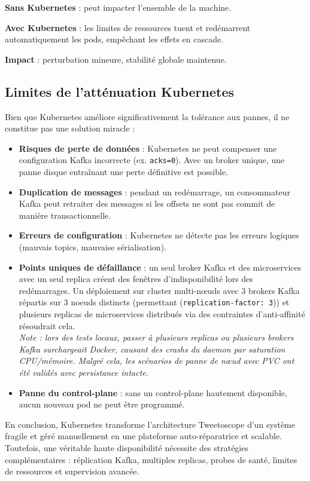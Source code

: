 \documentclass[10pt,a4paper]{article}
\begin{document}
\textbf{Sans Kubernetes} : peut impacter l’ensemble de la machine.

\textbf{Avec Kubernetes} : les limites de ressources tuent et redémarrent automatiquement les pods, empêchant les effets en cascade.

\textbf{Impact} : perturbation mineure, stabilité globale maintenue.

\subsection{Limites de l’atténuation Kubernetes}

Bien que Kubernetes améliore significativement la tolérance aux pannes, il ne constitue pas une solution miracle :

\begin{itemize}
    \item \textbf{Risques de perte de données} : Kubernetes ne peut compenser une configuration Kafka incorrecte (ex. \texttt{acks=0}). Avec un broker unique, une panne disque entraînant une perte définitive est possible.
    \item \textbf{Duplication de messages} : pendant un redémarrage, un consommateur Kafka peut retraiter des messages si les offsets ne sont pas commit de manière transactionnelle.
    \item \textbf{Erreurs de configuration} : Kubernetes ne détecte pas les erreurs logiques (mauvais topics, mauvaise sérialisation).
    \item \textbf{Points uniques de défaillance} : un seul broker Kafka et des microservices avec un seul replica créent des fenêtres d'indisponibilité lors des redémarrages. Un déploiement sur cluster multi-nœuds avec 3 brokers Kafka répartis sur 3 noeuds distincts (permettant (\texttt{replication-factor: 3})) et plusieurs replicas de microservices distribués via des contraintes d'anti-affinité résoudrait cela.\\[0.3em]
    \textit{Note : lors des tests locaux, passer à plusieurs replicas ou plusieurs brokers Kafka surchargeait Docker, causant des crashs du daemon par saturation CPU/mémoire. Malgré cela, les scénarios de panne de nœud avec PVC ont été validés avec persistance intacte.}
    \item \textbf{Panne du control-plane} : sans un control-plane hautement disponible, aucun nouveau pod ne peut être programmé.
\end{itemize}

En conclusion, Kubernetes transforme l’architecture Tweetoscope d’un système fragile et géré manuellement en une plateforme auto-réparatrice et scalable. Toutefois, une véritable haute disponibilité nécessite des stratégies complémentaires : réplication Kafka, multiples replicas, probes de santé, limites de ressources et supervision avancée.
\end{document}
